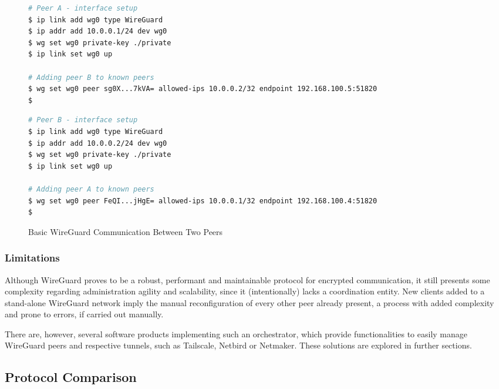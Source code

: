 \documentclass[11pt,twoside,a4paper]{report}
\begin{document}
\begin{figure}
\begin{multicols}{2}
\begin{lstlisting}[language=sh, frame=single, breaklines=true, breakatwhitespace=true, basicstyle=\small]
# Peer A - interface setup
$ ip link add wg0 type WireGuard
$ ip addr add 10.0.0.1/24 dev wg0
$ wg set wg0 private-key ./private
$ ip link set wg0 up

# Adding peer B to known peers
$ wg set wg0 peer sg0X...7kVA= allowed-ips 10.0.0.2/32 endpoint 192.168.100.5:51820
$

\end{lstlisting}
\columnbreak
\begin{lstlisting}[language=sh, frame=single, breaklines=true, breakatwhitespace=true, basicstyle=\small]
# Peer B - interface setup
$ ip link add wg0 type WireGuard
$ ip addr add 10.0.0.2/24 dev wg0
$ wg set wg0 private-key ./private
$ ip link set wg0 up

# Adding peer A to known peers
$ wg set wg0 peer FeQI...jHgE= allowed-ips 10.0.0.1/32 endpoint 192.168.100.4:51820
$

\end{lstlisting}
\end{multicols}
\caption{Basic WireGuard Communication Between Two Peers}
\label{fig:wgconf}
\end{figure}

\subsubsection{Limitations}
\label{sec:wglimits}

Although WireGuard proves to be a robust, performant and maintainable protocol for encrypted communication, it still presents some complexity regarding administration agility and scalability, since it (intentionally) lacks a coordination entity. New clients added to a stand-alone WireGuard network imply the manual reconfiguration of every other peer already present, a process with added complexity and prone to errors, if carried out manually.

There are, however, several software products implementing such an orchestrator, which provide functionalities to easily manage WireGuard peers and respective tunnels, such as Tailscale, Netbird or Netmaker. These solutions are explored in further sections.

\subsection{Protocol Comparison}
\end{document}
